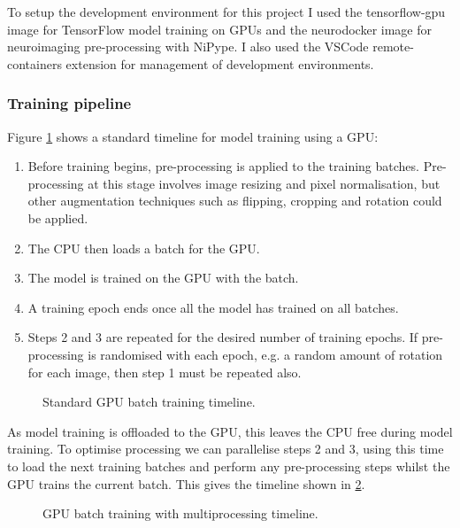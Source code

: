 \documentclass[
    author={Kai Hulme},
    supervisor={Dr Jon Bird},
    degree={BSc},
    title={Generative Adversarial Networks as an Augmentation Technique},
    subtitle={for Alzheimer's Disease Detection in MRI Volumes},
    type={Research},
    year={2021} 
]{dissertation}
\begin{document}
To setup the development environment for this project I used the tensorflow-gpu image for TensorFlow model training on GPUs and the neurodocker image for neuroimaging pre-processing with NiPype. I also used the VSCode remote-containers extension for management of development environments.

\subsubsection{Training pipeline}

Figure \ref{gpu_training_single} shows a standard timeline for model training using a GPU:

\begin{enumerate}
    \item Before training begins, pre-processing is applied to the training batches. Pre-processing at this stage involves image resizing and pixel normalisation, but other augmentation techniques such as flipping, cropping and rotation could be applied.
    \item The CPU then loads a batch for the GPU. 
    \item The model is trained on the GPU with the batch.
    \item A training epoch ends once all the model has trained on all batches.
    \item Steps 2 and 3 are repeated for the desired number of training epochs. If pre-processing is randomised with each epoch, e.g. a random amount of rotation for each image, then step 1 must be repeated also.
\end{enumerate}

\begin{figure}[t]
\centering
{}
\caption{Standard GPU batch training timeline.}
\label{gpu_training_single}
\end{figure}

As model training is offloaded to the GPU, this leaves the CPU free during model training. To optimise processing we can parallelise steps 2 and 3, using this time to load the next training batches and perform any pre-processing steps whilst the GPU trains the current batch. This gives the timeline shown in \ref{gpu_training_multi}. \\

\begin{figure}[t]
\centering
{}
\caption{GPU batch training with multiprocessing timeline.}
\label{gpu_training_multi}
\end{figure}
\end{document}
